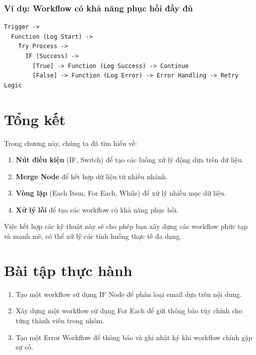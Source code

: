 \subsubsection{Ví dụ: Workflow có khả năng phục hồi đầy đủ}

\begin{verbatim}
Trigger -> 
  Function (Log Start) -> 
    Try Process -> 
      IF (Success) -> 
        [True] -> Function (Log Success) -> Continue
        [False] -> Function (Log Error) -> Error Handling -> Retry Logic
\end{verbatim}

\section{Tổng kết}

Trong chương này, chúng ta đã tìm hiểu về:

\begin{enumerate}
  \item \textbf{Nút điều kiện} (IF, Switch) để tạo các luồng xử lý động dựa trên dữ liệu.
  \item \textbf{Merge Node} để kết hợp dữ liệu từ nhiều nhánh.
  \item \textbf{Vòng lặp} (Each Item, For Each, While) để xử lý nhiều mục dữ liệu.
  \item \textbf{Xử lý lỗi} để tạo các workflow có khả năng phục hồi.
\end{enumerate}

Việc kết hợp các kỹ thuật này sẽ cho phép bạn xây dựng các workflow phức tạp và mạnh mẽ, có thể xử lý các tình huống thực tế đa dạng.

\section{Bài tập thực hành}

\begin{enumerate}
  \item Tạo một workflow sử dụng IF Node để phân loại email dựa trên nội dung.
  \item Xây dựng một workflow sử dụng For Each để gửi thông báo tùy chỉnh cho từng thành viên trong nhóm.
  \item Tạo một Error Workflow để thông báo và ghi nhật ký khi workflow chính gặp sự cố.
\end{enumerate}